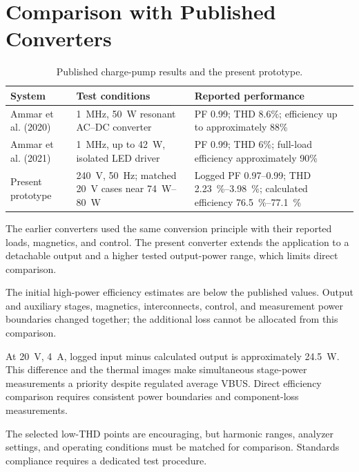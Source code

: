 \section{Comparison with Published Converters}
\label{sec:disc-reference}

\begin{table}[htbp]
\centering
\caption{Published charge-pump results and the present prototype.}
\label{tab:discussion-reference-comparison}
\small
\begin{tabularx}{\textwidth}{@{}L{0.23\textwidth}L{0.23\textwidth}Y@{}}
\toprule
System & Test conditions & Reported performance\\
\midrule
Ammar et al. (2020) \cite{ammar2020chargepump} & \SI{1}{\mega\hertz}, \SI{50}{\watt} resonant AC--DC converter & PF 0.99; THD 8.6\%; efficiency up to approximately 88\%\\
Ammar et al. (2021) \cite{ammar2021led} & \SI{1}{\mega\hertz}, up to \SI{42}{\watt}, isolated LED driver & PF 0.99; THD 6\%; full-load efficiency approximately 90\%\\
Present prototype & \SI{240}{\volt}, \SI{50}{\hertz}; matched \SI{20}{\volt} cases near \SIrange{74}{80}{\watt} & Logged PF 0.97--0.99; THD \SIrange{2.23}{3.98}{\percent}; calculated efficiency \SIrange{76.5}{77.1}{\percent}\\
\bottomrule
\end{tabularx}
\end{table}

The earlier converters used the same conversion principle with their
reported loads, magnetics, and control. The present converter extends the
application to a detachable output and a higher tested output-power range,
which limits direct comparison.

The initial high-power efficiency estimates are below the published
values. Output and auxiliary stages, magnetics, interconnects, control,
and measurement power boundaries changed together; the additional loss
cannot be allocated from this comparison.

At \SI{20}{\volt}, \SI{4}{\ampere}, logged input minus calculated
output is approximately \SI{24.5}{\watt}. This difference and the thermal
images make simultaneous stage-power measurements a priority despite
regulated average VBUS. Direct efficiency comparison requires consistent
power boundaries and component-loss measurements.

The selected low-THD points are encouraging, but harmonic ranges,
analyzer settings, and operating conditions must be matched for comparison.
Standards compliance requires a dedicated test procedure.
